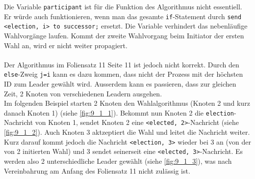 Die Variable \verb+participant+ ist für die Funktion des Algorithmus nicht
essentiell. Er würde auch funktionieren, wenn man das gesamte
\verb+if+-Statement durch 
\verb+send <election, i> to successor;+ ersetzt.
Die Variable verhindert das nebenläufige Wahlvorgänge laufen. Kommt der zweite
Wahlvorgang beim Initiator der ersten Wahl an, wird er nicht weiter propagiert.
\\ \\
Der Algorithmus im Foliensatz 11 Seite 11 ist jedoch nicht korrekt. Durch den
\verb+else+-Zweig \verb+j=i+ kann es dazu kommen, dass nicht der Prozess mit der
höchsten ID zum Leader gewählt wird. Ausserdem kann es passieren, dass zur
gleichen Zeit, 2 Knoten von verschiedenen Leadern ausgehen. \\
Im folgenden Beispiel starten 2 Knoten den Wahlalgorithmus (Knoten 2 und kurz
danach Knoten 1) (siehe \ref{fig:9_1_1}). Bekommt nun Knoten 2 die
\verb+election+-Nachricht von Knoten 1, sendet Knoten 2 eine \verb+<elected, 2>+-Nachricht 
(siehe \ref{fig:9_1_2}). Auch Knoten 3 aktzeptiert die Wahl und leitet die
Nachricht weiter. Kurz darauf kommt jedoch die Nachricht \verb+<election, 3>+ 
wieder bei 3 an (von der von 2 initierten Wahl) und 3 sendet seinerseit eine
\verb+<elected, 3>+-Nachricht. Es werden also 2 unterschiedliche Leader gewählt
(siehe \ref{fig:9_1_3}), was nach Vereinbahrung am Anfang des Foliensatz 11 nicht zulässig ist. 
